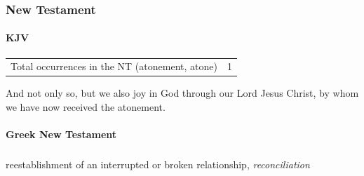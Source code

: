 			
		
		
	\subsubsection{New Testament} %
		\label{ATONEMENT-NT}
	
		\paragraph{KJV}
			\label{ATONEMENT-NT-KJV}
	
			\begin{tabular}{ll}
				Total occurrences in the NT (atonement, atone) & 1
			\end{tabular}
			
			\begin{compactdesc}
				\item[{\hyperref[ROMANS-5-11]{Romans 5:11}}] And not only so, but we also joy in God through our Lord Jesus Christ, by whom we have now received the atonement.
			\end{compactdesc}
			
		\paragraph{Greek New Testament}
			\label{ATONEMENT-GREEK}
		
			\subparagraph{\texorpdfstring{}{}}
				\label{KATALLAGE}
			
				\begin{compactdesc}
					\item[BDAG 462a] \textbf{}
						\begin{compactitem}
							\item reestablishment of an interrupted or broken relationship, \textit{reconciliation}
						\end{compactitem}
				\end{compactdesc}
				
